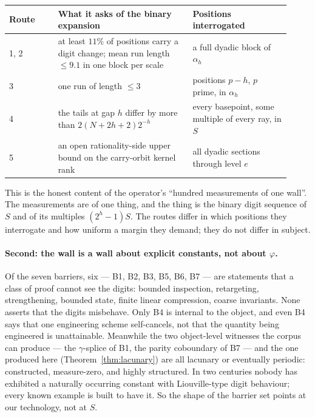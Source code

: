 \documentclass[11pt]{article}
\theoremstyle{breakplain}
\theoremstyle{breakdefinition}
\theoremstyle{breakdefinition}
\begin{document}
\begin{center}
\begin{tabular}{p{0.16\linewidth} p{0.44\linewidth} p{0.32\linewidth}}
\hline
Route & What it asks of the binary expansion & Positions interrogated \\
\hline
1, 2 & at least $11\%$ of positions carry a digit change; mean run length
$\le 9.1$ in one block per scale & a full dyadic block of $\alpha_h$ \\
3 & one run of length $\le 3$ & positions $p-h$, $p$ prime, in $\alpha_h$ \\
4 & the tails at gap $h$ differ by more than $2(N+2h+2)2^{-h}$ & every
basepoint, some multiple of every ray, in $S$ \\
5 & an open rationality-side upper bound on the carry-orbit kernel rank &
all dyadic sections through level $e$ \\
\hline
\end{tabular}
\end{center}

\noindent
This is the honest content of the operator's ``hundred measurements of one
wall''. The measurements are of one thing, and the thing is the binary digit
sequence of $S$ and of its multiples $(2^{h}-1)S$. The routes differ in which
positions they interrogate and how uniform a margin they demand; they do not
differ in subject.

\paragraph{Second: the wall is a wall about explicit constants, not about
$\varphi$.}
Of the seven barriers, six --- B1, B2, B3, B5, B6, B7 --- are statements that
a class of proof cannot see the digits: bounded inspection, retargeting,
strengthening, bounded state, finite linear compression, coarse invariants.
None asserts that the digits misbehave. Only B4 is internal to the object,
and even B4 says that one engineering scheme self-cancels, not that the
quantity being engineered is unattainable. Meanwhile the two object-level
witnesses the corpus can produce --- the $\gamma$-splice of B1, the parity
coboundary of B7 --- and the one produced here
(Theorem~\ref{thm:lacunary}) are all lacunary or eventually periodic:
constructed, measure-zero, and highly structured. In two centuries nobody has
exhibited a naturally occurring constant with Liouville-type digit behaviour;
every known example is built to have it. So the shape of the barrier set
points at our technology, not at $S$.
\end{document}
